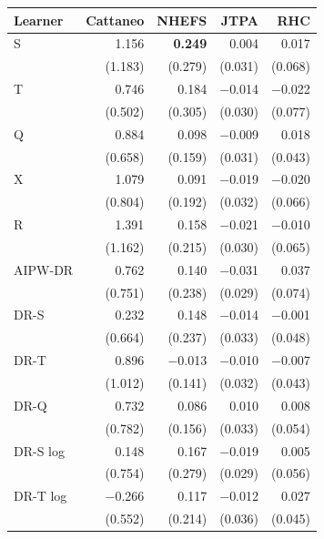 \begin{tabular}{l|rrrr}
\hline
Learner & Cattaneo & NHEFS & JTPA & RHC \\
\hline
S & 1.156 & \textbf{0.249} & 0.004 & 0.017 \\
 & \scriptsize (1.183) & \scriptsize (0.279) & \scriptsize (0.031) & \scriptsize (0.068) \\[2pt]
T & 0.746 & 0.184 & $-$0.014 & $-$0.022 \\
 & \scriptsize (0.502) & \scriptsize (0.305) & \scriptsize (0.030) & \scriptsize (0.077) \\[2pt]
\hline
Q & 0.884 & 0.098 & $-$0.009 & 0.018 \\
 & \scriptsize (0.658) & \scriptsize (0.159) & \scriptsize (0.031) & \scriptsize (0.043) \\[2pt]
\hline
X & 1.079 & 0.091 & $-$0.019 & $-$0.020 \\
 & \scriptsize (0.804) & \scriptsize (0.192) & \scriptsize (0.032) & \scriptsize (0.066) \\[2pt]
R & 1.391 & 0.158 & $-$0.021 & $-$0.010 \\
 & \scriptsize (1.162) & \scriptsize (0.215) & \scriptsize (0.030) & \scriptsize (0.065) \\[2pt]
AIPW-DR & 0.762 & 0.140 & $-$0.031 & 0.037 \\
 & \scriptsize (0.751) & \scriptsize (0.238) & \scriptsize (0.029) & \scriptsize (0.074) \\[2pt]
\hline
DR-S & 0.232 & 0.148 & $-$0.014 & $-$0.001 \\
 & \scriptsize (0.664) & \scriptsize (0.237) & \scriptsize (0.033) & \scriptsize (0.048) \\[2pt]
DR-T & 0.896 & $-$0.013 & $-$0.010 & $-$0.007 \\
 & \scriptsize (1.012) & \scriptsize (0.141) & \scriptsize (0.032) & \scriptsize (0.043) \\[2pt]
DR-Q & 0.732 & 0.086 & 0.010 & 0.008 \\
 & \scriptsize (0.782) & \scriptsize (0.156) & \scriptsize (0.033) & \scriptsize (0.054) \\[2pt]
\hline
DR-S log & 0.148 & 0.167 & $-$0.019 & 0.005 \\
 & \scriptsize (0.754) & \scriptsize (0.279) & \scriptsize (0.029) & \scriptsize (0.056) \\[2pt]
DR-T log & $-$0.266 & 0.117 & $-$0.012 & 0.027 \\
 & \scriptsize (0.552) & \scriptsize (0.214) & \scriptsize (0.036) & \scriptsize (0.045) \\[2pt]

\end{tabular}
